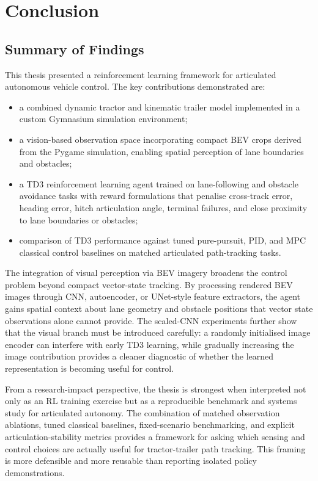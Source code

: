 \chapter{Conclusion}
\label{ch:conclusion}

\section{Summary of Findings}

This thesis presented a reinforcement learning framework for articulated autonomous vehicle control. The key contributions demonstrated are:
\begin{itemize}
    \item a combined dynamic tractor and kinematic trailer model implemented in a custom Gymnasium simulation environment;
    \item a vision-based observation space incorporating compact BEV crops derived from the Pygame simulation, enabling spatial perception of lane boundaries and obstacles;
    \item a TD3 reinforcement learning agent trained on lane-following and obstacle avoidance tasks with reward formulations that penalise cross-track error, heading error, hitch articulation angle, terminal failures, and close proximity to lane boundaries or obstacles;
    \item comparison of TD3 performance against tuned pure-pursuit, PID, and MPC classical control baselines on matched articulated path-tracking tasks.
\end{itemize}

The integration of visual perception via BEV imagery broadens the control problem beyond compact vector-state tracking. By processing rendered BEV images through CNN, autoencoder, or UNet-style feature extractors, the agent gains spatial context about lane geometry and obstacle positions that vector state observations alone cannot provide. The scaled-CNN experiments further show that the visual branch must be introduced carefully: a randomly initialised image encoder can interfere with early TD3 learning, while gradually increasing the image contribution provides a cleaner diagnostic of whether the learned representation is becoming useful for control.

From a research-impact perspective, the thesis is strongest when interpreted not only as an RL training exercise but as a reproducible benchmark and systems study for articulated autonomy. The combination of matched observation ablations, tuned classical baselines, fixed-scenario benchmarking, and explicit articulation-stability metrics provides a framework for asking which sensing and control choices are actually useful for tractor-trailer path tracking. This framing is more defensible and more reusable than reporting isolated policy demonstrations.

